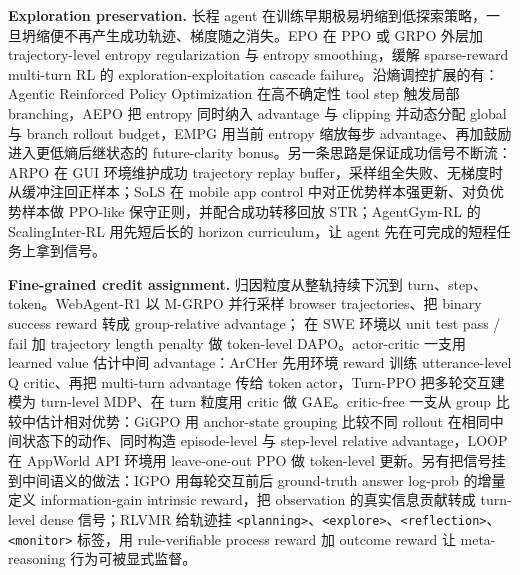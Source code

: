 \textbf{Exploration preservation.} 长程 agent 在训练早期极易坍缩到低探索策略，一旦坍缩便不再产生成功轨迹、梯度随之消失。EPO \cite{Xu25k} 在 PPO 或 GRPO 外层加 trajectory-level entropy regularization 与 entropy smoothing，缓解 sparse-reward multi-turn RL 的 exploration-exploitation cascade failure。沿熵调控扩展的有：Agentic Reinforced Policy Optimization \cite{Don25d} 在高不确定性 tool step 触发局部 branching，AEPO \cite{Don25c} 把 entropy 同时纳入 advantage 与 clipping 并动态分配 global 与 branch rollout budget，EMPG \cite{Wan25ad} 用当前 entropy 缩放每步 advantage、再加鼓励进入更低熵后继状态的 future-clarity bonus。另一条思路是保证成功信号不断流：ARPO \cite{Lu25f} 在 GUI 环境维护成功 trajectory replay buffer，采样组全失败、无梯度时从缓冲注回正样本；SoLS \cite{Pap25c} 在 mobile app control 中对正优势样本强更新、对负优势样本做 PPO-like 保守正则，并配合成功转移回放 STR；AgentGym-RL \cite{Xi25c} 的 ScalingInter-RL 用先短后长的 horizon curriculum，让 agent 先在可完成的短程任务上拿到信号。

\textbf{Fine-grained credit assignment.} 归因粒度从整轨持续下沉到 turn、step、token。WebAgent-R1 \cite{Wei25} 以 M-GRPO 并行采样 browser trajectories、把 binary success reward 转成 group-relative advantage；\cite{Gol25} 在 SWE 环境以 unit test pass / fail 加 trajectory length penalty 做 token-level DAPO。actor-critic 一支用 learned value 估计中间 advantage：ArCHer \cite{Zho24f} 先用环境 reward 训练 utterance-level Q critic、再把 multi-turn advantage 传给 token actor，Turn-PPO \cite{Li25ae} 把多轮交互建模为 turn-level MDP、在 turn 粒度用 critic 做 GAE。critic-free 一支从 group 比较中估计相对优势：GiGPO \cite{Fen25c} 用 anchor-state grouping 比较不同 rollout 在相同中间状态下的动作、同时构造 episode-level 与 step-level relative advantage，LOOP \cite{Che25af} 在 AppWorld API 环境用 leave-one-out PPO 做 token-level 更新。另有把信号挂到中间语义的做法：IGPO \cite{Wan25y} 用每轮交互前后 ground-truth answer log-prob 的增量定义 information-gain intrinsic reward，把 observation 的真实信息贡献转成 turn-level dense 信号；RLVMR \cite{Zha25ao} 给轨迹挂 \texttt{<planning>}、\texttt{<explore>}、\texttt{<reflection>}、\texttt{<monitor>} 标签，用 rule-verifiable process reward 加 outcome reward 让 meta-reasoning 行为可被显式监督。


